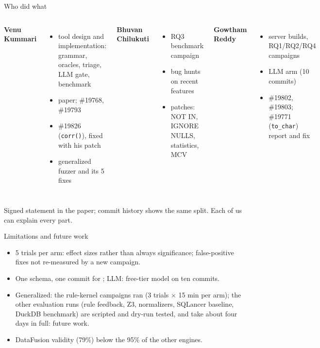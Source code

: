 \documentclass[aspectratio=169,10pt]{beamer}
\begin{document}
\begin{frame}{Who did what}
\small
\begin{columns}[T]
\textbf{Venu Kummari}
\begin{itemize}
  \item tool design and implementation: grammar, oracles, triage, LLM gate, benchmark
  \item paper; \#19768, \#19793
  \item \#19826 (\texttt{corr()}), fixed with his patch
  \item generalized fuzzer and its 5 fixes
\end{itemize}
\textbf{Bhuvan Chilukuti}
\begin{itemize}
  \item RQ3 benchmark campaign
  \item bug hunts on recent features
  \item patches: NOT IN, IGNORE NULLS, statistics, MCV
\end{itemize}
\textbf{Gowtham Reddy}
\begin{itemize}
  \item server builds, RQ1/RQ2/RQ4 campaigns
  \item LLM arm (10 commits)
  \item \#19802, \#19803; \#19771 (\texttt{to\_char}) report and fix
\end{itemize}
\end{columns}
\medskip
\small Signed statement in the paper; commit history shows the same split. Each of us can explain every part.
\end{frame}

\begin{frame}{Limitations and future work}
\small
\begin{itemize}
  \item 5 trials per arm: effect sizes rather than always significance; false-positive fixes not re-measured by a new campaign.
  \item One schema, one commit for \pg; LLM: free-tier model on ten commits.
  \item Generalized: the rule-kernel campaigns ran (3 trials $\times$ 15 min per arm); the other evaluation runs (rule feedback, Z3, normalizers, SQLancer baseline, DuckDB benchmark) are scripted and dry-run tested, and take about four days in full: future work.
  \item DataFusion validity (79\%) below the 95\% of the other engines.
\end{itemize}
\end{frame}
\end{document}
